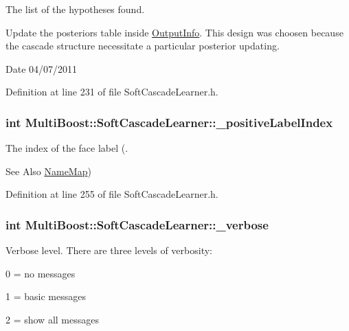 The list of the hypotheses found. 

Update the posteriors table inside \hyperlink{classMultiBoost_1_1OutputInfo}{Output\-Info}. This design was choosen because the cascade structure necessitate a particular posterior updating. \begin{DoxyDate}{Date}
04/07/2011 
\end{DoxyDate}


Definition at line 231 of file Soft\-Cascade\-Learner.\-h.

\hypertarget{classMultiBoost_1_1SoftCascadeLearner_a2320fe07381d7bf0ea101ff50735ec6e}{
\subsubsection[{\-\_\-positive\-Label\-Index}]{\setlength{\rightskip}{0pt plus 5cm}int Multi\-Boost\-::\-Soft\-Cascade\-Learner\-::\-\_\-positive\-Label\-Index\hspace{0.3cm}{\ttfamily [protected]}}}\label{classMultiBoost_1_1SoftCascadeLearner_a2320fe07381d7bf0ea101ff50735ec6e}


The index of the face label (. 

\begin{DoxySeeAlso}{See Also}
\hyperlink{classMultiBoost_1_1NameMap}{Name\-Map}) 
\end{DoxySeeAlso}


Definition at line 255 of file Soft\-Cascade\-Learner.\-h.

\hypertarget{classMultiBoost_1_1SoftCascadeLearner_a4e043a3e930234c2d408230892ec47f5}{
\subsubsection[{\-\_\-verbose}]{\setlength{\rightskip}{0pt plus 5cm}int Multi\-Boost\-::\-Soft\-Cascade\-Learner\-::\-\_\-verbose\hspace{0.3cm}{\ttfamily [protected]}}}\label{classMultiBoost_1_1SoftCascadeLearner_a4e043a3e930234c2d408230892ec47f5}
Verbose level. There are three levels of verbosity\-:
\begin{DoxyItemize}
\item 0 = no messages
\item 1 = basic messages
\item 2 = show all messages 
\end{DoxyItemize}

